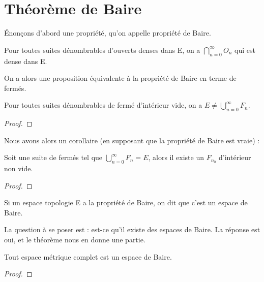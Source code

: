 \chapter{Théorème de Baire}

Énonçons d'abord une propriété, qu'on appelle propriété de Baire.

\begin{propriete} 
	Pour toutes suites dénombrables d'ouverts denses dans E, on a $\displaystyle
	\bigcap_{n = 0}^{\infty} O_{n}$ qui est dense dans E.
\end{propriete}

On a alors une proposition équivalente à la propriété de Baire en terme de
fermés.

\begin{propriete} 
	Pour toutes suites dénombrables de fermé d'intérieur vide, on a $E \neq
	\displaystyle \bigcup_{n = 0}^{\infty} F_{n}$.
\end{propriete}

\begin{proof}
	
\end{proof}

Nous avons alors un corollaire (en supposant que la propriété de Baire est
vraie) :

\begin{corollary}
	Soit une suite  de fermés tel que $\displaystyle
	\bigcup_{n = 0}^{\infty}{F_{n}} = E$, alors il existe un $F_{n_{0}}$
	d'intérieur non vide.
\end{corollary}

\begin{proof}
	
\end{proof}

\begin{definition} 
	Si un espace topologie E a la propriété de Baire, on dit que c'est un espace
	de Baire.
\end{definition}

La question à se poser est : est-ce qu'il existe des espaces de Baire. La
réponse est oui, et le théorème nous en donne une partie.

\begin{theorem} 
	Tout espace métrique complet est un espace de Baire.
\end{theorem}

\begin{proof}
	
\end{proof}


